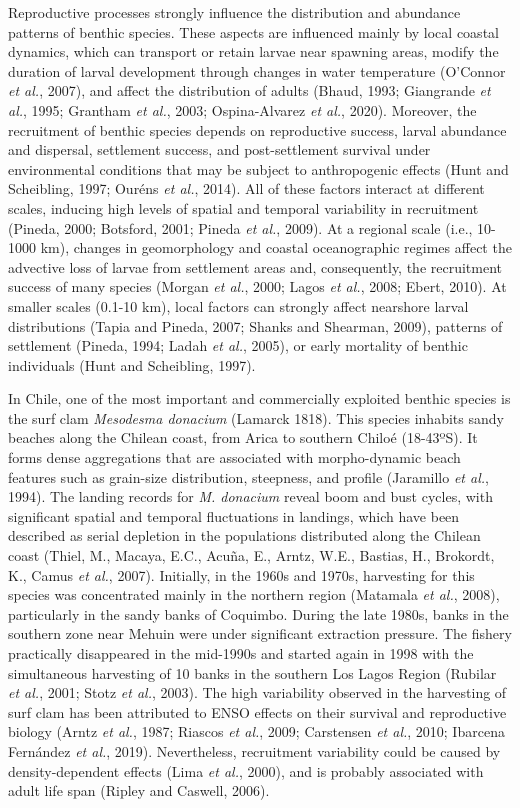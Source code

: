 \documentclass[12pt]{article}
\begin{document}
Reproductive processes strongly influence the distribution and abundance
patterns of benthic species. These aspects are influenced mainly by
local coastal dynamics, which can transport or retain larvae near
spawning areas, modify the duration of larval development through
changes in water temperature (O'Connor \emph{et al.}, 2007), and affect
the distribution of adults (Bhaud, 1993; Giangrande \emph{et al.}, 1995;
Grantham \emph{et al.}, 2003; Ospina-Alvarez \emph{et al.}, 2020).
Moreover, the recruitment of benthic species depends on reproductive
success, larval abundance and dispersal, settlement success, and
post-settlement survival under environmental conditions that may be
subject to anthropogenic effects (Hunt and Scheibling, 1997; Ouréns
\emph{et al.}, 2014). All of these factors interact at different scales,
inducing high levels of spatial and temporal variability in recruitment
(Pineda, 2000; Botsford, 2001; Pineda \emph{et al.}, 2009). At a
regional scale (i.e., 10-1000 km), changes in geomorphology and coastal
oceanographic regimes affect the advective loss of larvae from
settlement areas and, consequently, the recruitment success of many
species (Morgan \emph{et al.}, 2000; Lagos \emph{et al.}, 2008; Ebert,
2010). At smaller scales (0.1-10 km), local factors can strongly affect
nearshore larval distributions (Tapia and Pineda, 2007; Shanks and
Shearman, 2009), patterns of settlement (Pineda, 1994; Ladah \emph{et
al.}, 2005), or early mortality of benthic individuals (Hunt and
Scheibling, 1997).

In Chile, one of the most important and commercially exploited benthic
species is the surf clam \emph{Mesodesma donacium} (Lamarck 1818). This
species inhabits sandy beaches along the Chilean coast, from Arica to
southern Chiloé (18-43ºS). It forms dense aggregations that are
associated with morpho-dynamic beach features such as grain-size
distribution, steepness, and profile (Jaramillo \emph{et al.}, 1994).
The landing records for \emph{M. donacium} reveal boom and bust cycles,
with significant spatial and temporal fluctuations in landings, which
have been described as serial depletion in the populations distributed
along the Chilean coast (Thiel, M., Macaya, E.C., Acuña, E., Arntz,
W.E., Bastias, H., Brokordt, K., Camus \emph{et al.}, 2007). Initially,
in the 1960s and 1970s, harvesting for this species was concentrated
mainly in the northern region (Matamala \emph{et al.}, 2008),
particularly in the sandy banks of Coquimbo. During the late 1980s,
banks in the southern zone near Mehuin were under significant extraction
pressure. The fishery practically disappeared in the mid-1990s and
started again in 1998 with the simultaneous harvesting of 10 banks in
the southern Los Lagos Region (Rubilar \emph{et al.}, 2001; Stotz
\emph{et al.}, 2003). The high variability observed in the harvesting of
surf clam has been attributed to ENSO effects on their survival and
reproductive biology (Arntz \emph{et al.}, 1987; Riascos \emph{et al.},
2009; Carstensen \emph{et al.}, 2010; Ibarcena Fernández \emph{et al.},
2019). Nevertheless, recruitment variability could be caused by
density-dependent effects (Lima \emph{et al.}, 2000), and is probably
associated with adult life span (Ripley and Caswell, 2006).
\end{document}

